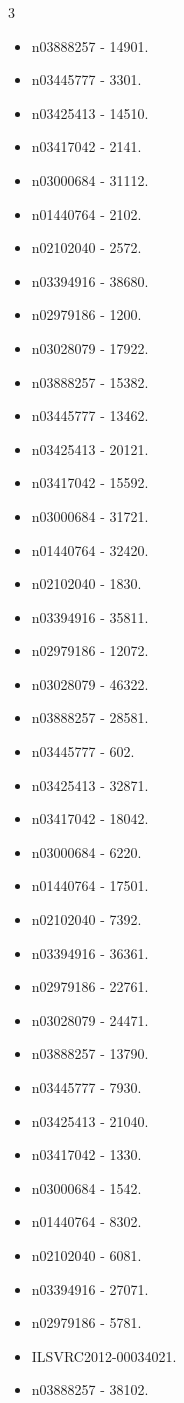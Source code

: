 \begin{multicols}{3}
\begin{itemize}
\item n03888257 - 14901.
\item n03445777 - 3301.
\item n03425413 - 14510.
\item n03417042 - 2141.
\item n03000684 - 31112.
\item n01440764 - 2102.
\item n02102040 - 2572.
\item n03394916 - 38680.
\item n02979186 - 1200.
\item n03028079 - 17922.
\item n03888257 - 15382.
\item n03445777 - 13462.
\item n03425413 - 20121.
\item n03417042 - 15592.
\item n03000684 - 31721.
\item n01440764 - 32420.
\item n02102040 - 1830.
\item n03394916 - 35811.
\item n02979186 - 12072.
\item n03028079 - 46322.
\item n03888257 - 28581.
\item n03445777 - 602.
\item n03425413 - 32871.
\item n03417042 - 18042.
\item n03000684 - 6220.
\item n01440764 - 17501.
\item n02102040 - 7392.
\item n03394916 - 36361.
\item n02979186 - 22761.
\item n03028079 - 24471.
\item n03888257 - 13790.
\item n03445777 - 7930.
\item n03425413 - 21040.
\item n03417042 - 1330.
\item n03000684 - 1542.
\item n01440764 - 8302.
\item n02102040 - 6081.
\item n03394916 - 27071.
\item n02979186 - 5781.
\item ILSVRC2012-00034021.
\item n03888257 - 38102.

\end{itemize}
\end{multicols}
